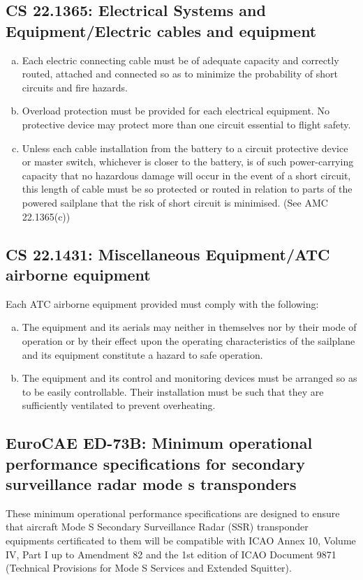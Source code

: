 \documentclass[twoside]{article}
\begin{document}
\subsection[CS 22.1365]{CS 22.1365:  Electrical Systems and Equipment/Electric cables and equipment}
\begin{enumerate}[(a)] 
\item Each electric connecting cable must be of adequate capacity and correctly routed, attached and connected so as to minimize the probability of short circuits and fire hazards.
\item Overload protection must be provided for each electrical equipment. No protective device may protect more than one circuit essential to flight safety.
\item Unless each cable installation from the battery to a circuit protective device or master switch, whichever is closer to the battery, is of such power-carrying capacity that no hazardous damage will occur in the event of a short circuit, this length of cable must be so protected or routed in relation to parts of the powered sailplane that the risk of short circuit is minimised. (See AMC 22.1365(c))
\end{enumerate}

\subsection[CS 22.1431]{CS 22.1431:  Miscellaneous Equipment/ATC airborne equipment}
Each ATC airborne equipment provided must comply with the following:
\begin{enumerate}[(a)]
\item The equipment and its aerials may neither in themselves nor by their mode of operation or by their effect upon the operating characteristics of the sailplane and its equipment constitute a hazard to safe operation.
\item The equipment and its control and monitoring devices must be arranged so as to be easily controllable. Their installation must be such that they are sufficiently ventilated to prevent overheating.
\end{enumerate}


\subsection[EuroCAE ED-73B]{EuroCAE ED-73B: Minimum operational performance specifications for secondary surveillance radar mode s transponders}
These minimum operational performance specifications are designed to ensure that aircraft Mode S Secondary Surveillance Radar (SSR) transponder equipments certificated to them will be compatible with ICAO Annex 10, Volume IV, Part I up to Amendment 82 and the 1st edition of ICAO Document 9871 (Technical Provisions for Mode S Services and Extended Squitter). 
\end{document}
